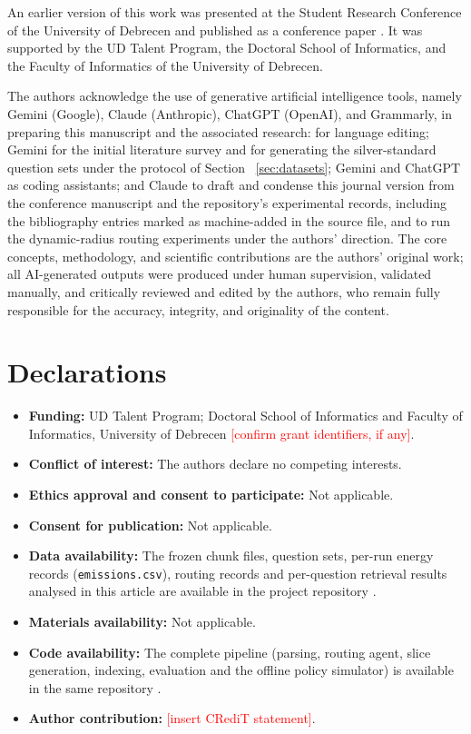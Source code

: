 \documentclass[pdflatex,sn-mathphys-num]{sn-jnl}
\newcommand{\todo}[1]{\textcolor{red}{#1}}
\theoremstyle{thmstyleone}%
\theoremstyle{thmstylethree}%
\begin{document}
\backmatter

An earlier version of this work was presented at the Student Research Conference of the University of Debrecen and published as a conference paper \cite{sandor2025documentslicecontextualretrieval}. It was supported by the UD Talent Program, the Doctoral School of Informatics, and the Faculty of Informatics of the University of Debrecen.

The authors acknowledge the use of generative artificial intelligence tools, namely Gemini (Google), Claude (Anthropic), ChatGPT (OpenAI), and Grammarly, in preparing this manuscript and the associated research: for language editing; Gemini for the initial literature survey and for generating the silver-standard question sets under the protocol of Section ~\ref{sec:datasets}; Gemini and ChatGPT as coding assistants; and Claude to draft and condense this journal version from the conference manuscript and the repository's experimental records, including the bibliography entries marked as machine-added in the source file, and to run the dynamic-radius routing experiments under the authors' direction. The core concepts, methodology, and scientific contributions are the authors' original work; all AI-generated outputs were produced under human supervision, validated manually, and critically reviewed and edited by the authors, who remain fully responsible for the accuracy, integrity, and originality of the content.

\section{Declarations}

\begin{itemize}
\item \textbf{Funding:} UD Talent Program; Doctoral School of Informatics and Faculty of Informatics, University of Debrecen \todo{[confirm grant identifiers, if any]}.
\item \textbf{Conflict of interest:} The authors declare no competing interests.
\item \textbf{Ethics approval and consent to participate:} Not applicable.
\item \textbf{Consent for publication:} Not applicable.
\item \textbf{Data availability:} The frozen chunk files, question sets, per-run energy records (\texttt{emissions.csv}), routing records and per-question retrieval results analysed in this article are available in the project repository \cite{sandor2025documentslicecontextualretrieval}.
\item \textbf{Materials availability:} Not applicable.
\item \textbf{Code availability:} The complete pipeline (parsing, routing agent, slice generation, indexing, evaluation and the offline policy simulator) is available in the same repository \cite{sandor2025documentslicecontextualretrieval}.
\item \textbf{Author contribution:} \todo{[insert CRediT statement]}.
\end{itemize}


\end{document}
